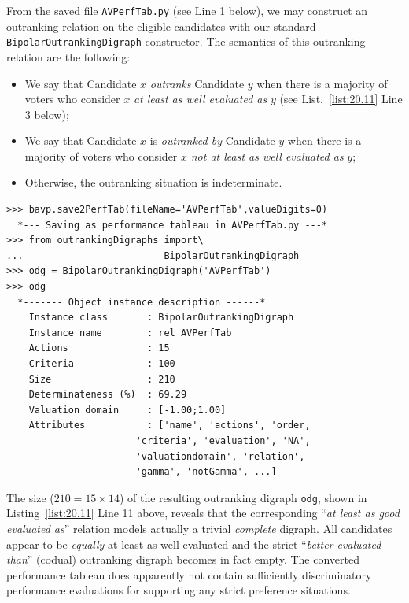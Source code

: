From the saved file \texttt{AVPerfTab.py} (see Line 1 below), we may construct an outranking relation on the eligible candidates with our standard \texttt{BipolarOutrankingDigraph} constructor. The semantics of this outranking relation are the following:
\begin{itemize}[nosep,leftmargin=0.5cm,rightmargin=0.5cm]
\item We say that Candidate $x$ \emph{outranks} Candidate $y$ when there is a majority of voters who consider $x$ \emph{at least as well evaluated as} $y$ (see List.~\vref{list:20.11} Line 3 below);
\item We say that Candidate $x$ is \emph{outranked by} Candidate $y$ when there is a majority of voters who consider $x$ \emph{not at least as well evaluated as} $y$;
\item Otherwise, the outranking situation is indeterminate.
\end{itemize}
\begin{lstlisting}[caption={Computing the outranking digraph},label=list:20.11]
>>> bavp.save2PerfTab(fileName='AVPerfTab',valueDigits=0)
  *--- Saving as performance tableau in AVPerfTab.py ---*
>>> from outrankingDigraphs import\
...                         BipolarOutrankingDigraph
>>> odg = BipolarOutrankingDigraph('AVPerfTab')
>>> odg
  *------- Object instance description ------*
    Instance class       : BipolarOutrankingDigraph
    Instance name        : rel_AVPerfTab
    Actions              : 15
    Criteria             : 100
    Size                 : 210
    Determinateness (%)  : 69.29
    Valuation domain     : [-1.00;1.00]
    Attributes           : ['name', 'actions', 'order,
                       'criteria', 'evaluation', 'NA',
                       'valuationdomain', 'relation',
                       'gamma', 'notGamma', ...]
\end{lstlisting}
The size ($210 = 15 \times 14$) of the resulting outranking digraph \texttt{odg}, shown in Listing~\vref{list:20.11} Line 11 above, reveals that the corresponding ``\emph{at least as good evaluated as}'' relation models actually a trivial \emph{complete} digraph. All candidates appear to be \emph{equally} at least as well evaluated and the strict ``\emph{better evaluated than}'' (codual) outranking digraph becomes in fact empty. The converted performance tableau does apparently not contain sufficiently discriminatory performance evaluations for supporting any strict preference situations.

